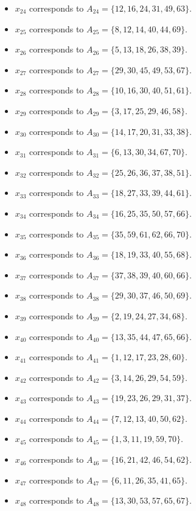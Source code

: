 \documentclass[11pt]{article}
\begin{document}
\begin{itemize}
\item $x_{24}$ corresponds to $A_{24}=\{12, 16, 24, 31, 49, 63\}$.
\item $x_{25}$ corresponds to $A_{25}=\{8, 12, 14, 40, 44, 69\}$.
\item $x_{26}$ corresponds to $A_{26}=\{5, 13, 18, 26, 38, 39\}$.
\item $x_{27}$ corresponds to $A_{27}=\{29, 30, 45, 49, 53, 67\}$.
\item $x_{28}$ corresponds to $A_{28}=\{10, 16, 30, 40, 51, 61\}$.
\item $x_{29}$ corresponds to $A_{29}=\{3, 17, 25, 29, 46, 58\}$.
\item $x_{30}$ corresponds to $A_{30}=\{14, 17, 20, 31, 33, 38\}$.
\item $x_{31}$ corresponds to $A_{31}=\{6, 13, 30, 34, 67, 70\}$.
\item $x_{32}$ corresponds to $A_{32}=\{25, 26, 36, 37, 38, 51\}$.
\item $x_{33}$ corresponds to $A_{33}=\{18, 27, 33, 39, 44, 61\}$.
\item $x_{34}$ corresponds to $A_{34}=\{16, 25, 35, 50, 57, 66\}$.
\item $x_{35}$ corresponds to $A_{35}=\{35, 59, 61, 62, 66, 70\}$.
\item $x_{36}$ corresponds to $A_{36}=\{18, 19, 33, 40, 55, 68\}$.
\item $x_{37}$ corresponds to $A_{37}=\{37, 38, 39, 40, 60, 66\}$.
\item $x_{38}$ corresponds to $A_{38}=\{29, 30, 37, 46, 50, 69\}$.
\item $x_{39}$ corresponds to $A_{39}=\{2, 19, 24, 27, 34, 68\}$.
\item $x_{40}$ corresponds to $A_{40}=\{13, 35, 44, 47, 65, 66\}$.
\item $x_{41}$ corresponds to $A_{41}=\{1, 12, 17, 23, 28, 60\}$.
\item $x_{42}$ corresponds to $A_{42}=\{3, 14, 26, 29, 54, 59\}$.
\item $x_{43}$ corresponds to $A_{43}=\{19, 23, 26, 29, 31, 37\}$.
\item $x_{44}$ corresponds to $A_{44}=\{7, 12, 13, 40, 50, 62\}$.
\item $x_{45}$ corresponds to $A_{45}=\{1, 3, 11, 19, 59, 70\}$.
\item $x_{46}$ corresponds to $A_{46}=\{16, 21, 42, 46, 54, 62\}$.
\item $x_{47}$ corresponds to $A_{47}=\{6, 11, 26, 35, 41, 65\}$.
\item $x_{48}$ corresponds to $A_{48}=\{13, 30, 53, 57, 65, 67\}$.

\end{itemize}
\end{document}
